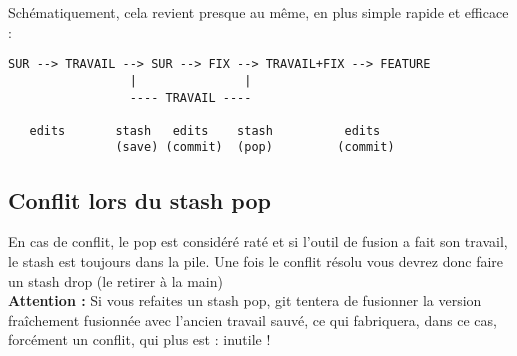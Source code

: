 Schématiquement, cela revient presque au même, en plus simple rapide et efficace :       
\begin{verbatim}
SUR --> TRAVAIL --> SUR --> FIX --> TRAVAIL+FIX --> FEATURE 
                 |               |
                 ---- TRAVAIL ----
                 
   edits       stash   edits    stash          edits
               (save) (commit)  (pop)         (commit)
\end{verbatim}

\subsection{Conflit lors du stash pop}

En cas de conflit, le pop est considéré raté et si l'outil de fusion a fait son travail,
le stash est toujours dans la pile. Une fois le conflit résolu vous devrez donc faire un stash drop (le retirer à la main)\\

\textbf{Attention : } Si vous refaites un stash pop, git tentera de fusionner la version fraîchement fusionnée avec l'ancien travail sauvé, ce qui fabriquera, dans ce cas, forcément un conflit, qui plus est : inutile !